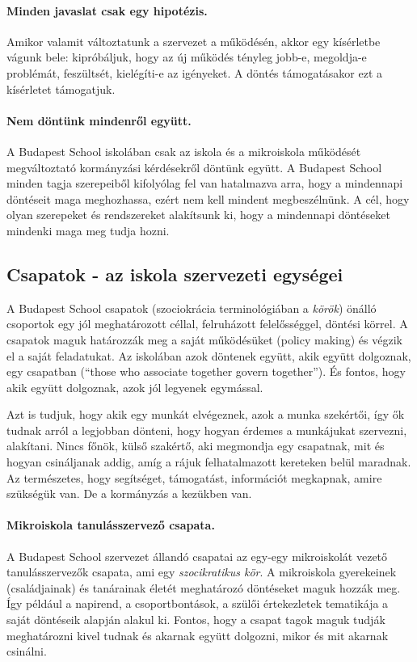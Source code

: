\paragraph{Minden javaslat csak egy hipotézis.} Amikor valamit változtatunk a szervezet a működésén, akkor egy kísérletbe vágunk bele: kipróbáljuk, hogy az új működés tényleg jobb-e, megoldja-e  problémát, feszültsét, kielégíti-e az igényeket. A döntés támogatásakor ezt a kísérletet támogatjuk. 

\paragraph{Nem döntünk mindenről együtt.} A Budapest School iskolában csak az iskola és a mikroiskola működését megváltoztató kormányzási kérdésekről döntünk együtt. A Budapest School minden tagja szerepeiből kifolyólag fel van hatalmazva arra, hogy a mindennapi döntéseit maga meghozhassa, ezért nem kell mindent megbeszélnünk. A cél, hogy olyan szerepeket és rendszereket alakítsunk ki, hogy a mindennapi döntéseket mindenki maga meg tudja hozni.

\subsection{Csapatok - az iskola szervezeti egységei}
A Budapest School csapatok (szociokrácia terminológiában a \emph{körök}) önálló csoportok egy jól meghatározott céllal, felruházott felelősséggel, döntési körrel. A csapatok maguk határozzák meg a saját működésüket (policy making) és végzik el a saját feladatukat. 
Az iskolában azok döntenek együtt, akik együtt dolgoznak, egy csapatban (“those	who	associate	together	
govern	 together”). És fontos, hogy akik együtt dolgoznak, azok jól legyenek egymással.

Azt is tudjuk, hogy akik egy munkát elvégeznek, azok a munka szekértői, így ők tudnak arról a legjobban dönteni, hogy hogyan érdemes a munkájukat szervezni, alakítani. Nincs főnök, külső szakértő, aki megmondja egy csapatnak, mit és hogyan csináljanak addig, amíg a rájuk felhatalmazott kereteken belül maradnak. Az természetes, hogy segítséget, támogatást, információt megkapnak, amire szükségük van. De a kormányzás a kezükben van.


\paragraph{Mikroiskola tanulásszervező csapata.} A Budapest School szervezet állandó csapatai az egy-egy mikroiskolát vezető tanulásszervezők csapata, ami egy \emph{szocikratikus kör}. A mikroiskola gyerekeinek (családjainak) és tanárainak életét meghatározó döntéseket maguk hozzák meg. Így például a napirend, a csoportbontások, a szülői értekezletek tematikája a saját döntéseik alapján alakul ki. Fontos, hogy a csapat tagok maguk tudják meghatározni kivel tudnak és akarnak együtt dolgozni, mikor és mit akarnak csinálni.

